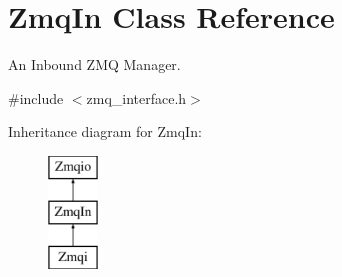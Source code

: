 \hypertarget{classZmqIn}{\section{Zmq\-In Class Reference}
\label{classZmqIn}
}


An Inbound Z\-M\-Q Manager.  




{\ttfamily \#include $<$zmq\-\_\-interface.\-h$>$}

Inheritance diagram for Zmq\-In\-:\begin{figure}[H]
\begin{center}
\leavevmode
\includegraphics[height=3.000000cm]{classZmqIn}
\end{center}
\end{figure}
